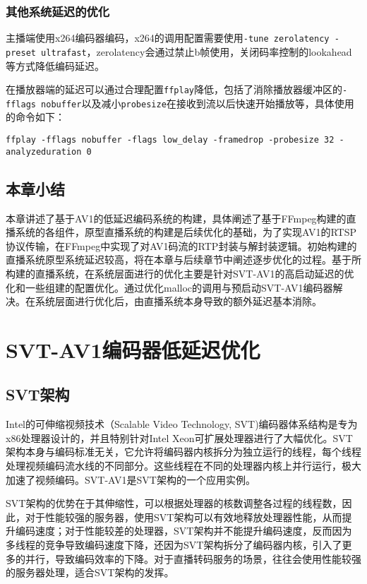 	\subsection{其他系统延迟的优化}

	主播端使用x264编码器编码，x264的调用配置需要使用\texttt{-tune zerolatency -preset ultrafast}，zerolatency会通过禁止b帧使用，关闭码率控制的lookahead等方式降低编码延迟。

	在播放器端的延迟可以通过合理配置\texttt{ffplay}降低，包括了消除播放器缓冲区的\texttt{-fflags nobuffer}以及减小\texttt{probesize}在接收到流以后快速开始播放等，具体使用的命令如下：

	\texttt{ffplay -fflags nobuffer -flags low\_delay -framedrop -probesize 32 -analyzeduration 0}
\section{本章小结}
  本章讲述了基于AV1的低延迟编码系统的构建，具体阐述了基于FFmpeg构建的直播系统的各组件，原型直播系统的构建是后续优化的基础，为了实现AV1的RTSP协议传输，在FFmpeg中实现了对AV1码流的RTP封装与解封装逻辑。初始构建的直播系统原型系统延迟较高，将在本章与后续章节中阐述逐步优化的过程。基于所构建的直播系统，在系统层面进行的优化主要是针对SVT-AV1的高启动延迟的优化和一些组建的配置优化。通过优化malloc的调用与预启动SVT-AV1编码器解决。在系统层面进行优化后，由直播系统本身导致的额外延迟基本消除。


\chapter{SVT-AV1编码器低延迟优化}

\section{SVT架构}
  Intel的可伸缩视频技术（Scalable Video Technology, SVT\cite{ScalableVideoTechnology2019})编码器体系结构是专为x86处理器设计的，并且特别针对Intel Xeon可扩展处理器进行了大幅优化。SVT架构本身与编码标准无关，它允许将编码器内核拆分为独立运行的线程，每个线程处理视频编码流水线的不同部分。这些线程在不同的处理器内核上并行运行，极大加速了视频编码。SVT-AV1是SVT架构的一个应用实例。

  SVT架构的优势在于其伸缩性，可以根据处理器的核数调整各过程的线程数，因此，对于性能较强的服务器，使用SVT架构可以有效地释放处理器性能，从而提升编码速度；对于性能较差的处理器，SVT架构并不能提升编码速度，反而因为多线程的竞争导致编码速度下降，还因为SVT架构拆分了编码器内核，引入了更多的并行，导致编码效率的下降。对于直播转码服务的场景，往往会使用性能较强的服务器处理，适合SVT架构的发挥。

